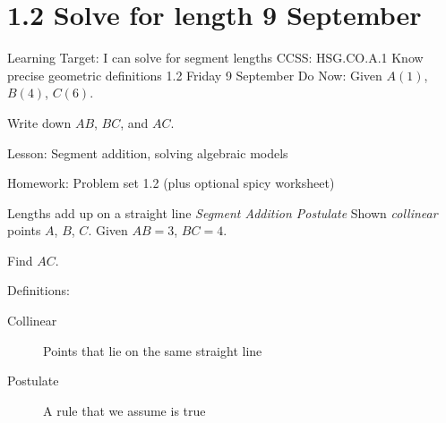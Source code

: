 \section{1.2 Solve for length \hfill 9 September}
\begin{frame}{Learning Target: I can solve for segment lengths}
  {CCSS: HSG.CO.A.1 Know precise geometric definitions  \hfill \alert{1.2 Friday 9 September}}
  Do Now: Given $A(1)$, $B(4)$, $C(6)$. \par \medskip
  Write down $AB$, $BC$, and $AC$.
  \begin{center}
  \end{center} \vspace{1cm}
  Lesson: Segment addition, solving algebraic models \par \medskip
  Homework: Problem set 1.2 (plus optional spicy worksheet)
  \end{frame}

\begin{frame}{Lengths add up on a straight line}
  {\emph{Segment Addition Postulate}}
  Shown \emph{collinear} points $A$, $B$, $C$. Given $AB=3$, $BC=4$. \par \medskip
  Find $AC$.
    \begin{center}
    \end{center} \vspace{1cm}
    Definitions:
    \begin{description}
      \item[Collinear] Points that lie on the same straight line
      \item[Postulate] A rule that we assume is true
    \end{description}
  \end{frame}

